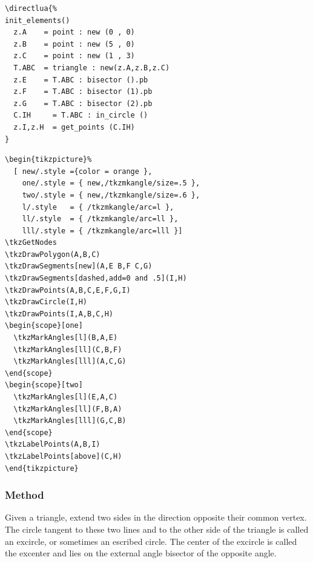 \begin{minipage}{.5\textwidth}
\begin{Verbatim}
\directlua{%
init_elements()
  z.A    = point : new (0 , 0)
  z.B    = point : new (5 , 0)
  z.C    = point : new (1 , 3)
  T.ABC  = triangle : new(z.A,z.B,z.C)
  z.E    = T.ABC : bisector ().pb
  z.F    = T.ABC : bisector (1).pb
  z.G    = T.ABC : bisector (2).pb
  C.IH     = T.ABC : in_circle ()
  z.I,z.H  = get_points (C.IH)
}
\end{Verbatim}
\end{minipage}
\begin{minipage}{.5\textwidth}
\begin{Verbatim}
\begin{tikzpicture}%
  [ new/.style ={color = orange },
    one/.style = { new,/tkzmkangle/size=.5 },
    two/.style = { new,/tkzmkangle/size=.6 },
    l/.style   = { /tkzmkangle/arc=l },
    ll/.style  = { /tkzmkangle/arc=ll },
    lll/.style = { /tkzmkangle/arc=lll }]
\tkzGetNodes
\tkzDrawPolygon(A,B,C)
\tkzDrawSegments[new](A,E B,F C,G)
\tkzDrawSegments[dashed,add=0 and .5](I,H)
\tkzDrawPoints(A,B,C,E,F,G,I)
\tkzDrawCircle(I,H)
\tkzDrawPoints(I,A,B,C,H)
\begin{scope}[one]
  \tkzMarkAngles[l](B,A,E)
  \tkzMarkAngles[ll](C,B,F)
  \tkzMarkAngles[lll](A,C,G)
\end{scope}
\begin{scope}[two]
  \tkzMarkAngles[l](E,A,C)
  \tkzMarkAngles[ll](F,B,A)
  \tkzMarkAngles[lll](G,C,B)
\end{scope}
\tkzLabelPoints(A,B,I)
\tkzLabelPoints[above](C,H)
\end{tikzpicture}
\end{Verbatim}
\end{minipage}



\subsubsection{Method } %
\label{ssub:method_imeth_triangle_ex__circle}

Given a triangle, extend two sides in the direction opposite their common vertex. The circle tangent to these two lines and to the other side of the triangle is called an excircle, or sometimes an escribed circle. The center  of the excircle is called the excenter and lies on the external angle bisector of the opposite angle.

